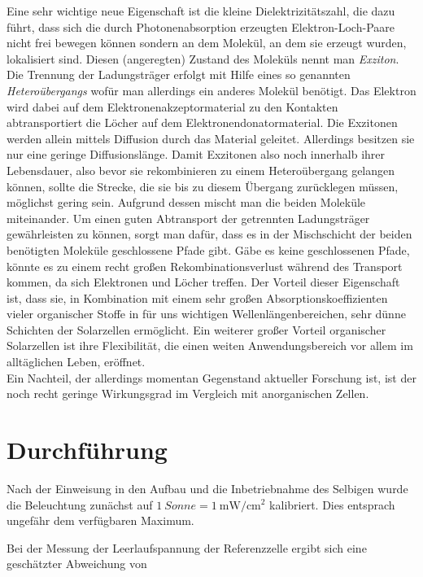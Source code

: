 \documentclass[slug=SZ, room=Hermann-Krone-Bau\,\ Labor\ 1.25, supervisor=Martin\ Kroll]{../../Lab_Report_LaTeX/lab_report}
\newcommand{\sun}[1]{\SI{#1}{Sonne}}
\newcommand{\mwcm}[1]{\SI{#1}{\milli\watt\per\centi\meter^2}}
\begin{document}
Eine sehr wichtige neue Eigenschaft ist die kleine Dielektrizitätszahl, die dazu führt, dass sich die durch
Photonenabsorption erzeugten Elektron-Loch-Paare nicht frei bewegen können sondern an dem Molekül, an dem sie
erzeugt wurden, lokalisiert sind. Diesen (angeregten) Zustand des Moleküls nennt man \emph{Exziton}.
Die Trennung der Ladungsträger erfolgt mit Hilfe eines so genannten \emph{Heteroübergangs} wofür man allerdings
ein anderes Molekül benötigt. Das Elektron wird dabei auf dem Elektronenakzeptormaterial zu den Kontakten
abtransportiert die Löcher auf dem Elektronendonatormaterial.
Die Exzitonen werden allein mittels Diffusion durch das Material geleitet. Allerdings besitzen sie nur eine
geringe Diffusionslänge. Damit Exzitonen also noch innerhalb ihrer Lebensdauer, also bevor sie rekombinieren
zu einem Heteroübergang gelangen können, sollte die Strecke, die sie bis zu diesem Übergang zurücklegen müssen,
möglichst gering sein. Aufgrund dessen mischt man die beiden Moleküle miteinander.
Um einen guten Abtransport der getrennten Ladungsträger gewährleisten zu können, sorgt man dafür, dass es in der
Mischschicht der beiden benötigten Moleküle geschlossene Pfade gibt. Gäbe es keine geschlossenen Pfade, könnte
es zu einem recht großen Rekombinationsverlust während des Transport kommen, da sich Elektronen und Löcher
treffen.
Der Vorteil dieser Eigenschaft ist, dass sie, in Kombination mit einem sehr großen Absorptionskoeffizienten
vieler organischer Stoffe in für uns wichtigen Wellenlängenbereichen, sehr dünne Schichten der Solarzellen
ermöglicht.
Ein weiterer großer Vorteil organischer Solarzellen ist ihre Flexibilität, die einen weiten Anwendungsbereich
vor allem im alltäglichen Leben, eröffnet.\\

Ein Nachteil, der allerdings momentan Gegenstand aktueller Forschung ist, ist der noch recht geringe
Wirkungsgrad im Vergleich mit anorganischen Zellen.


\section{Durchf\"uhrung}
\label{sec:durchf}

Nach der Einweisung in den Aufbau und die Inbetriebnahme des Selbigen
wurde die Beleuchtung zun\"achst auf $\sun{1}=\mwcm{1}$
kalibriert. Dies entsprach ungef\"ahr dem verf\"ugbaren Maximum.

Bei der Messung der Leerlaufspannung der Referenzzelle ergibt sich eine
gesch\"atzter Abweichung von
\end{document}
